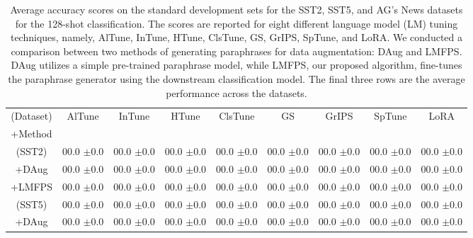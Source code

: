\documentclass[11pt]{article}
\begin{document}
\begin{table*}
\centering
\caption{Average accuracy scores on the standard development sets for the SST2, SST5, and AG's News datasets for the 128-shot classification. The scores are reported for eight different language model (LM) tuning techniques, namely, AlTune, InTune, HTune, ClsTune, GS, GrIPS, SpTune, and LoRA. We conducted a comparison between two methods of generating paraphrases for data augmentation: DAug and LMFPS. DAug utilizes a simple pre-trained paraphrase model, while LMFPS, our proposed algorithm, fine-tunes the paraphrase generator using the downstream classification model. The final three rows are the average performance across the datasets.}
\begin{tabular}{c | c | c | c | c | c | c | c | c}
\hline
(Dataset) & AlTune & InTune & HTune & ClsTune & GS & GrIPS & SpTune & LoRA \\
\small+Method &  &  &  &  &  &  &  &  \\
\hline
(SST2) & \small00.0 \small$\pm$\small0.0 & \small00.0 \small$\pm$\small0.0 & \small00.0 \small$\pm$\small0.0 & \small00.0 \small$\pm$\small0.0 & \small00.0 \small$\pm$\small0.0 & \small00.0 \small$\pm$\small0.0 & \small00.0 \small$\pm$\small0.0 & \small00.0 \small$\pm$\small0.0\\
\small+DAug & \small00.0 \small$\pm$\small0.0 & \small00.0 \small$\pm$\small0.0 & \small00.0 \small$\pm$\small0.0 & \small00.0 \small$\pm$\small0.0 & \small00.0 \small$\pm$\small0.0 & \small00.0 \small$\pm$\small0.0 & \small00.0 \small$\pm$\small0.0 & \small00.0 \small$\pm$\small0.0\\
\small+LMFPS & \small00.0 \small$\pm$\small0.0 & \small00.0 \small$\pm$\small0.0 & \small00.0 \small$\pm$\small0.0 & \small00.0 \small$\pm$\small0.0 & \small00.0 \small$\pm$\small0.0 & \small00.0 \small$\pm$\small0.0 & \small00.0 \small$\pm$\small0.0 & \small00.0 \small$\pm$\small0.0\\
\hline
(SST5) & \small00.0 \small$\pm$\small0.0 & \small00.0 \small$\pm$\small0.0 & \small00.0 \small$\pm$\small0.0 & \small00.0 \small$\pm$\small0.0 & \small00.0 \small$\pm$\small0.0 & \small00.0 \small$\pm$\small0.0 & \small00.0 \small$\pm$\small0.0 & \small00.0 \small$\pm$\small0.0\\
\small+DAug & \small00.0 \small$\pm$\small0.0 & \small00.0 \small$\pm$\small0.0 & \small00.0 \small$\pm$\small0.0 & \small00.0 \small$\pm$\small0.0 & \small00.0 \small$\pm$\small0.0 & \small00.0 \small$\pm$\small0.0 & \small00.0 \small$\pm$\small0.0 & \small00.0 \small$\pm$\small0.0\\

\end{tabular}
\end{table*}
\end{document}

